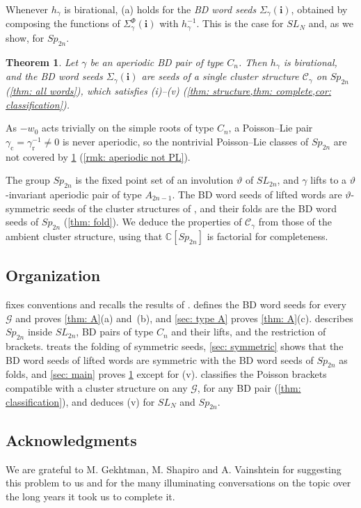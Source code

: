 \documentclass[a4paper]{amsart}
\numberwithin{equation}{section}
\newtheorem{theorem}{Theorem}[section]
\theoremstyle{definition}
\theoremstyle{remark}
\newcommand{\bbC}{\mathbb{C}}
\newcommand{\mcG}{\mathcal{G}}
\newcommand{\mcC}{\mathcal{C}}
\newcommand{\bfi}{\mathbf{i}}
\newcommand{\vt}{\vartheta}
\newcommand{\rr}{\mathrm{r}}
\newcommand{\cc}{\mathrm{c}}
\newcommand{\Sp}{Sp_{2n}}
\newcommand{\SL}{SL_{2n}}
\begin{document}
Whenever $h_\gamma$ is birational, (a) holds for the \emph{BD word seeds} $\Sigma_\gamma(\bfi)$, obtained by composing the functions of $\Sigma^\Phi_\gamma(\bfi)$ with $h_\gamma^{-1}$.
This is the case for $SL_N$ \cite{GSV23} and, as we show, for $Sp_{2n}$.

\begin{theorem}
  \label{thm: main}
  Let $\gamma$ be an aperiodic BD pair of type $C_n$.
  Then $h_\gamma$ is birational, and the BD word seeds $\Sigma_\gamma(\bfi)$ are seeds of a single cluster structure $\mcC_\gamma$ on $\Sp$ (\cref{thm: all words}), which satisfies (i)--(v) (\cref{thm: structure,thm: complete,cor: classification}).
\end{theorem}

As $-w_0$ acts trivially on the simple roots of type $C_n$, a Poisson--Lie pair $\gamma_{\cc}=\gamma_{\rr}^{-1}\neq0$ is never aperiodic, so the nontrivial Poisson--Lie classes of $Sp_{2n}$ are not covered by \cref{thm: main} (\cref{rmk: aperiodic not PL}).

The group $\Sp$ is the fixed point set of an involution $\vt$ of $\SL$, and $\gamma$ lifts to a $\vt$-invariant aperiodic pair of type $A_{2n-1}$.
The BD word seeds of lifted words are $\vt$-symmetric seeds of the cluster structures of \cite{GSV23}, and their folds are the BD word seeds of $\Sp$ (\cref{thm: fold}).
We deduce the properties of $\mcC_\gamma$ from those of the ambient cluster structure, using that $\bbC[\Sp]$ is factorial for completeness.

\subsection*{Organization}
 fixes conventions and recalls the results of \cite{GSV19,GSV23}.
 defines the BD word seeds for every $\mcG$ and proves \cref{thm: A}(a) and~(b), and \cref{sec: type A} proves \cref{thm: A}(c).
 describes $\Sp$ inside $\SL$, BD pairs of type $C_n$ and their lifts, and the restriction of brackets.
 treats the folding of symmetric seeds, \cref{sec: symmetric} shows that the BD word seeds of lifted words are symmetric with the BD word seeds of $\Sp$ as folds, and \cref{sec: main} proves \cref{thm: main} except for (v).
 classifies the Poisson brackets compatible with a cluster structure on any $\mcG$, for any BD pair (\cref{thm: classification}), and deduces (v) for $SL_N$ and $\Sp$.

\subsection*{Acknowledgments}
We are grateful to M. Gekhtman, M. Shapiro and A. Vainshtein for suggesting this problem to us and for the many illuminating conversations on the topic over the long years it took us to complete it.
\end{document}
